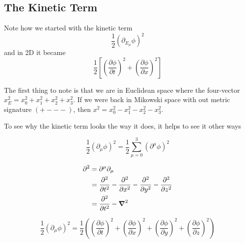 \subsection{The Kinetic Term}

Note how we started with the kinetic term
$$
\frac{1}{2} \left( \partial_{E_\mu} \phi \right)^2
$$
and in 2D it became
$$
\frac{1}{2} \left[ 
    \left( \frac{\partial \phi}{\partial t} \right)^2 +  \left( \frac{\partial \phi}{\partial x} \right)^2
\right]
$$

The first thing to note is that we are in Euclidean space where the four-vector
$x_{E}^{2} = x_{0}^{2} + x_{1}^{2} + x_{2}^{2} + x_{3}^{2}$.
If we were back in Mikowski space with out metric signature $(+ - - -)$,
then $x^{2} = x_{0}^{2} - x_{1}^{2} - x_{2}^{2} - x_{3}^{2}$.

To see why the kinetic term looks the way it does, it helps to see it other ways


$$
\frac{1}{2} (\partial_{\mu} \phi)^2 = \frac{1}{2} \sum_{\mu=0}^{3} (\partial^{\mu} \phi)^2
$$

\begin{align*}
\partial^2 &= \partial^\mu \partial_\mu \\
&= \frac{\partial^2}{\partial t^2} - \frac{\partial^2}{\partial x^2} - \frac{\partial^2}{\partial y^2} - \frac{\partial^2}{\partial z^2} \\
&= \frac{\partial^2}{\partial t^2} - \boldsymbol{\mathbf{\nabla}}^2
\end{align*}



$$
\frac{1}{2} (\partial_{\mu} \phi)^2 =
\frac{1}{2} \left( 
    \left(\frac{\partial \phi}{\partial t}\right)^2 +
    \left(\frac{\partial \phi}{\partial x}\right)^2 +
    \left(\frac{\partial \phi}{\partial y}\right)^2 +
    \left(\frac{\partial \phi}{\partial z}\right)^2
\right)
$$